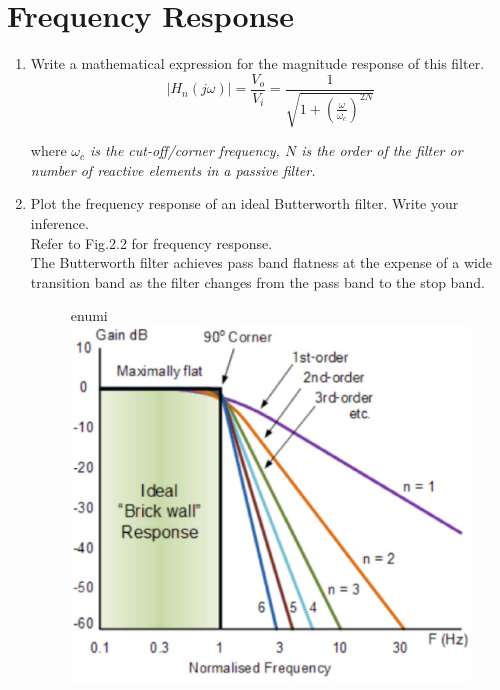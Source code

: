 \documentclass[journal,12pt,twocolumn]{IEEEtran}
\renewcommand\thesection{\arabic{section}}
\begin{document}
\section{Frequency Response}
\begin{enumerate}[label=\thesection.\arabic*,ref=\thesection.\theenumi]
\item Write a mathematical expression for the magnitude response of this filter.\\
\solution
\bigskip
\vspace{-1em} $$ |H_{n}(j\omega)|= \frac{V_{o}}{V_{i}}=\frac{1}{\sqrt{1+{(\frac{\omega}{\omega _c}) ^{2N}}}}$$

 where \textit{$\omega _c $ is the cut-off/corner frequency, $N$ is the order of the filter or number of reactive elements in a passive filter.\\}
\item Plot the frequency response of an ideal Butterworth filter. Write your inference.\\
\solution Refer to Fig.2.2 for frequency response.\\
The Butterworth filter achieves pass band flatness at the expense of a wide transition band as the filter changes from the pass band to the stop band.

\begin{figure}{enumi}
\centering
\includegraphics[width=\columnwidth]{./figs/plotforgain.eps}
\caption{}
\label{fig:1}
\end{figure}
\end{enumerate}
\end{document}
